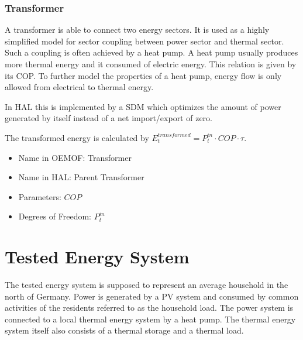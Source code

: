 \documentclass[a4paper,12pt]{book}
\theoremstyle{break}
\begin{document}
\subsubsection{Transformer}
A transformer is able to connect two energy sectors.
It is used as a highly simplified model for sector coupling between power sector and thermal sector. Such a coupling is often achieved by a heat pump. A heat pump usually produces more thermal energy and it consumed of electric energy. This relation is given by its \ac{COP}. To further model the properties of a heat pump, energy flow is only allowed from electrical to thermal energy.

In HAL this is implemented by a \ac{SDM} which optimizes the amount of power generated by itself instead of a net import/export of zero.

The transformed energy is calculated by $E^{transformed}_t = P^{in}_{t} \cdot COP \cdot \tau$.

\begin{itemize}
	\item Name in \ac{OEMOF}: Transformer
	\item Name in HAL: Parent Transformer
	\item Parameters: $COP$
	\item Degrees of Freedom: $P^{in}_{t}$
\end{itemize}

\section{Tested Energy System}\label{s/meth/grid}
The tested energy system is supposed to represent an average household in the north of Germany.
Power is generated by a \ac{PV} system and consumed by common activities of the residents referred to as the household load.
The power system is connected to a local thermal energy system by a heat pump. 
The thermal energy system itself also consists of a thermal storage and a thermal load.
\end{document}
